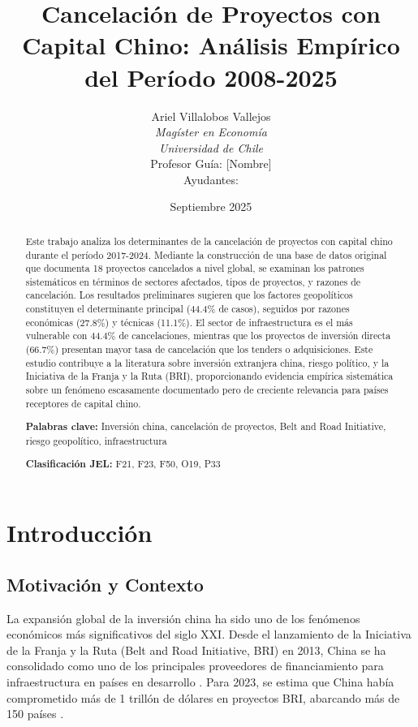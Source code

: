 \documentclass[12pt]{article}
\title{\textbf{Cancelación de Proyectos con Capital Chino: Análisis Empírico del Período 2008-2025}}
\author{
Ariel Villalobos Vallejos\\
\textit{Magíster en Economía}\\
\textit{Universidad de Chile}\\[1em]
Profesor Guía: [Nombre]\\
Ayudantes:
}
\date{Septiembre 2025}
\begin{document}
\maketitle
\thispagestyle{empty}

\begin{abstract}
\noindent Este trabajo analiza los determinantes de la cancelación de proyectos con capital chino durante el período 2017-2024. Mediante la construcción de una base de datos original que documenta 18 proyectos cancelados a nivel global, se examinan los patrones sistemáticos en términos de sectores afectados, tipos de proyectos, y razones de cancelación. Los resultados preliminares sugieren que los factores geopolíticos constituyen el determinante principal (44.4\% de casos), seguidos por razones económicas (27.8\%) y técnicas (11.1\%). El sector de infraestructura es el más vulnerable con 44.4\% de cancelaciones, mientras que los proyectos de inversión directa (66.7\%) presentan mayor tasa de cancelación que los tenders o adquisiciones. Este estudio contribuye a la literatura sobre inversión extranjera china, riesgo político, y la Iniciativa de la Franja y la Ruta (BRI), proporcionando evidencia empírica sistemática sobre un fenómeno escasamente documentado pero de creciente relevancia para países receptores de capital chino.

\vspace{0.5cm}
\noindent \textbf{Palabras clave:} Inversión china, cancelación de proyectos, Belt and Road Initiative, riesgo geopolítico, infraestructura

\vspace{0.5cm}
\noindent \textbf{Clasificación JEL:} F21, F23, F50, O19, P33
\end{abstract}

\newpage
\tableofcontents
\newpage

\section{Introducción}

\subsection{Motivación y Contexto}

La expansión global de la inversión china ha sido uno de los fenómenos económicos más significativos del siglo XXI. Desde el lanzamiento de la Iniciativa de la Franja y la Ruta (Belt and Road Initiative, BRI) en 2013, China se ha consolidado como uno de los principales proveedores de financiamiento para infraestructura en países en desarrollo \citep{hurley2019examining}. Para 2023, se estima que China había comprometido más de 1 trillón de dólares en proyectos BRI, abarcando más de 150 países \citep{horn2021china}.
\end{document}
